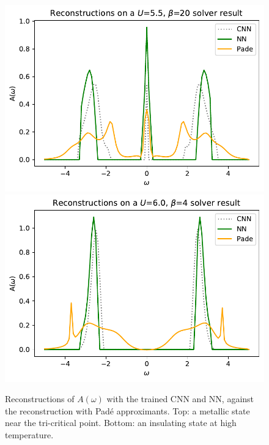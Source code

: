 \documentclass[reprint,amsmath,amssymb,aps,pra]{revtex4-2}
\begin{document}
\begin{figure}[H]
\includegraphics[width=0.9\columnwidth]{pred-metal.pdf}
\includegraphics[width=0.9\columnwidth]{pred_isolant.pdf}
\caption{\label{fig:reconstr-final}Reconstructions of $A(\omega)$ with the trained CNN and NN, against the reconstruction with Padé approximants. Top: a metallic state near the tri-critical point. Bottom: an insulating state at high temperature.}
\end{figure}

\onecolumngrid
\end{document}
